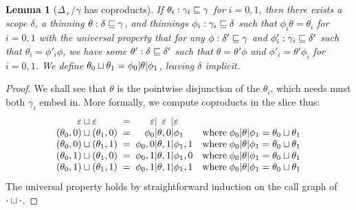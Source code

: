 \documentclass{jfp1}
\newtheorem{lemma}[theorem]{Lemma}
\newcommand{\emp}{\varepsilon}
\begin{document}
\begin{lemma}[$\Delta_+/\gamma$ has coproducts]
  If $\theta_i : \gamma_i\sqsubseteq\gamma$ for $i=0,1$, then there exists a
  scope $\delta$, a thinning $\theta : \delta\sqsubseteq\gamma$, and
  thinnings $\phi_i : \gamma_i\sqsubseteq\delta$ such that
  $\phi_i\theta = \theta_i$  for $i=0,1$ with the universal property that
  for any $\phi:\delta'\sqsubseteq\gamma$ and $\phi'_i : \gamma_i\sqsubseteq\delta'$ such that
  $\theta_i = \phi'_i\phi$, we have some $\theta' :
  \delta\sqsubseteq\delta'$ such that
  $\theta=\theta'\phi$ and
  $\phi'_i = \theta'\phi_i$ for $i=0,1$. We define
  $\theta_0 \sqcup \theta_1 = \phi_0 | \theta | \phi_1$,
  leaving $\delta$ implicit.
\end{lemma}
\begin{proof}
  We shall see that $\theta$ is the pointwise disjunction of the $\theta_i$,
  which needs must both $\gamma_i$ embed in. More formally, we compute
  coproducts in the slice thus:
  \[\begin{array}{c@{\;\;=\;\;}r@{|}c@{|}ll}
    \cp{\emp}{\emp} & \emp&\emp&\emp & \\
    \cp{(\theta_0,0)}{(\theta_1,0)} & \phi_0&\theta,0&\phi_1
      & \mbox{where}\;\phi_0|\theta|\phi_1 = \cp{\theta_0}{\theta_1} \\                                     
    \cp{(\theta_0,0)}{(\theta_1,1)} & \phi_0,0&\theta,1&\phi_1,1
      & \mbox{where}\;\phi_0|\theta|\phi_1 = \cp{\theta_0}{\theta_1} \\
    \cp{(\theta_0,1)}{(\theta_1,0)} & \phi_0,1&\theta,1&\phi_1,0
      & \mbox{where}\;\phi_0|\theta|\phi_1 = \cp{\theta_0}{\theta_1} \\
    \cp{(\theta_0,1)}{(\theta_1,1)} & \phi_0,1&\theta,1&\phi_1,1
      & \mbox{where}\;\phi_0|\theta|\phi_1 = \cp{\theta_0}{\theta_1} \\
    \end{array}\]
  The universal property holds by straightforward induction on the call graph
  of $\cdot \sqcup \cdot$.
\end{proof}
\end{document}
